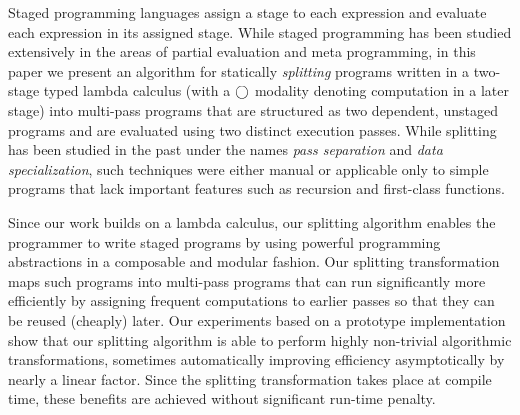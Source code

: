 Staged programming languages assign a stage to each expression and
evaluate each expression in its assigned stage.
While staged programming has been studied extensively in the areas of
partial evaluation and meta programming, in this paper we present an
algorithm for statically {\em splitting} programs written in a
two-stage typed lambda calculus (with a $\bigcirc$ modality denoting
computation in a later stage) into multi-pass programs that are
structured as two dependent, unstaged programs and are evaluated using
two distinct execution passes.  While splitting has been studied in the past
under the names \emph{pass separation} and \emph{data specialization},
such techniques were either manual or applicable only to simple programs
that lack important features such as recursion and first-class
functions.

Since our work builds on a lambda calculus, our splitting algorithm
enables the programmer to write staged programs by using powerful
programming abstractions in a composable and modular fashion. Our
splitting transformation maps such programs into multi-pass programs
that can run significantly more efficiently by assigning frequent
computations to earlier passes so that they can be reused (cheaply)
later.  Our experiments based on a prototype implementation show that
our splitting algorithm is able to perform highly non-trivial algorithmic
transformations, sometimes automatically improving efficiency
asymptotically by nearly a linear factor.  Since the splitting
transformation takes place at compile time, these benefits are
achieved without significant run-time penalty.





